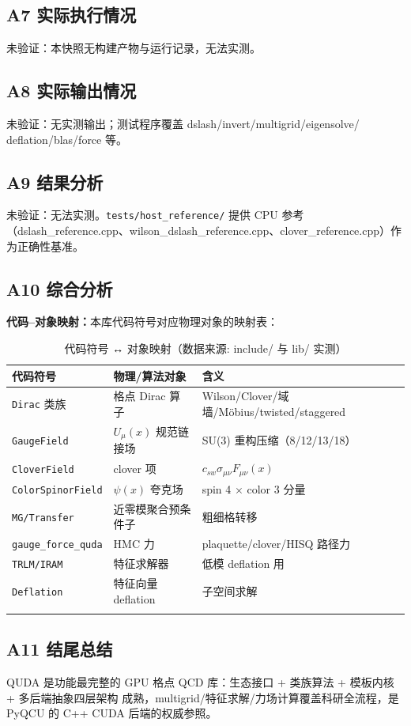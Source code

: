 \documentclass[UTF8]{ctexart}
\begin{document}
\subsection{A7 实际执行情况}
\textcolor{warn}{未验证}：本快照无构建产物与运行记录，无法实测。

\subsection{A8 实际输出情况}
\textcolor{warn}{未验证}：无实测输出；测试程序覆盖 dslash/invert/multigrid/eigensolve/
deflation/blas/force 等。

\subsection{A9 结果分析}
\textcolor{warn}{未验证}：无法实测。\nolinkurl{tests/host_reference/} 提供 CPU 参考
（dslash\_reference.cpp、wilson\_dslash\_reference.cpp、clover\_reference.cpp）作为正确性基准。

\subsection{A10 综合分析}
\textbf{代码--对象映射：}本库代码符号对应物理对象的映射表：
\begin{xltabular}{\textwidth}{lXX}
\toprule
\textcolor{struct}{代码符号} & 物理/算法对象 & 含义 \\
\midrule
\endhead
\texttt{Dirac\*} 类族 & 格点 Dirac 算子 & Wilson/Clover/域墙/Möbius/twisted/staggered \\
\texttt{GaugeField} & $U_\mu(x)$ 规范链接场 & SU(3) 重构压缩（8/12/13/18）\\
\texttt{CloverField} & clover 项 & $c_{sw}\sigma_{\mu\nu}F_{\mu\nu}(x)$\\
\texttt{ColorSpinorField} & $\psi(x)$ 夸克场 & spin 4 $\times$ color 3 分量 \\
\texttt{MG/Transfer} & 近零模聚合预条件子 & 粗细格转移 \\
\nolinkurl{gauge_force_quda} & HMC 力 & plaquette/clover/HISQ 路径力 \\
\texttt{TRLM/IRAM} & 特征求解器 & 低模 deflation 用 \\
\texttt{Deflation} & 特征向量 deflation & 子空间求解 \\
\bottomrule
\caption{代码符号 ↔ 对象映射（数据来源: include/ 与 lib/ 实测）}
\end{xltabular}

\subsection{A11 结尾总结}
\begin{conclbox}
QUDA 是功能最完整的 GPU 格点 QCD 库：生态接口 + 类族算法 + 模板内核 + 多后端抽象四层架构
成熟，multigrid/特征求解/力场计算覆盖科研全流程，是 PyQCU 的 C++ CUDA 后端的权威参照。
\end{conclbox}
\end{document}
